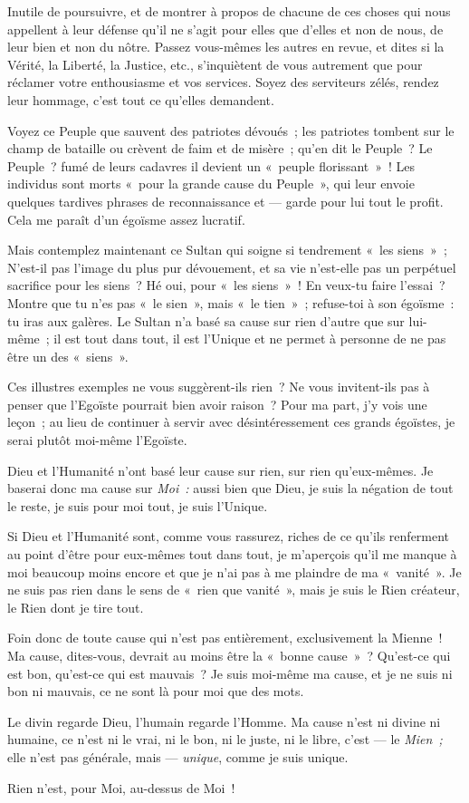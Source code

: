 \documentclass[french,twoside]{book} %
\begin{document}
Inutile de poursuivre, et de montrer à propos de chacune de ces choses qui nous appellent à leur défense qu’il ne s’agit pour elles que d’elles et non de nous, de leur bien et non du nôtre. Passez vous-mêmes les autres en revue, et dites si la Vérité, la Liberté, la Justice, etc., s’inquiètent de vous autrement que pour réclamer votre enthousiasme et vos services. Soyez des serviteurs zélés, rendez leur hommage, c’est tout ce qu’elles demandent.\par
Voyez ce Peuple que sauvent des patriotes dévoués ; les patriotes tombent sur le champ de bataille ou  crèvent de faim et de misère ; qu’en dit le Peuple ? Le Peuple ? fumé de leurs cadavres il devient un « peuple florissant » ! Les individus sont morts « pour la grande cause du Peuple », qui leur envoie quelques tardives phrases de reconnaissance et — garde pour lui tout le profit. Cela me paraît d’un égoïsme assez lucratif.\par
Mais contemplez maintenant ce Sultan qui soigne si tendrement « les siens » ; N’est-il pas l’image du plus pur dévouement, et sa vie n’est-elle pas un perpétuel sacrifice pour les siens ? Hé oui, pour « les siens » ! En veux-tu faire l’essai ? Montre que tu n’es pas « le sien », mais « le tien » ; refuse-toi à son égoïsme : tu iras aux galères. Le Sultan n’a basé sa cause sur rien d’autre que sur lui-même ; il est tout dans tout, il est l’Unique et ne permet à personne de ne pas être un des « siens ».\par
Ces illustres exemples ne vous suggèrent-ils rien ? Ne vous invitent-ils pas à penser que l’Egoïste pourrait bien avoir raison ? Pour ma part, j’y vois une leçon ; au lieu de continuer à servir avec désintéressement ces grands égoïstes, je serai plutôt moi-même l’Egoïste.\par
Dieu et l’Humanité n’ont basé leur cause sur rien, sur rien qu’eux-mêmes. Je baserai donc ma cause sur \emph{Moi :} aussi bien que Dieu, je suis la négation de tout le reste, je suis pour moi tout, je suis l’Unique.\par
Si Dieu et l’Humanité sont, comme vous rassurez, riches de ce qu’ils renferment au point d’être pour eux-mêmes tout dans tout, je m’aperçois qu’il me manque à moi beaucoup moins encore et que je n’ai pas à me plaindre de ma « vanité ». Je ne suis pas rien dans le sens de « rien que vanité », mais je suis le Rien créateur, le Rien dont je tire tout.\par
Foin donc de toute cause qui n’est pas entièrement, exclusivement la Mienne ! Ma cause, dites-vous, devrait au moins être la « bonne cause » ? Qu’est-ce qui est bon, qu’est-ce qui est mauvais ? Je suis moi-même  ma cause, et je ne suis ni bon ni mauvais, ce ne sont là pour moi que des mots.\par
Le divin regarde Dieu, l’humain regarde l’Homme. Ma cause n’est ni divine ni humaine, ce n’est ni le vrai, ni le bon, ni le juste, ni le libre, c’est — le \emph{Mien ;} elle n’est pas générale, mais — \emph{unique}, comme je suis unique.\par
Rien n’est, pour Moi, au-dessus de Moi !
\end{document}
